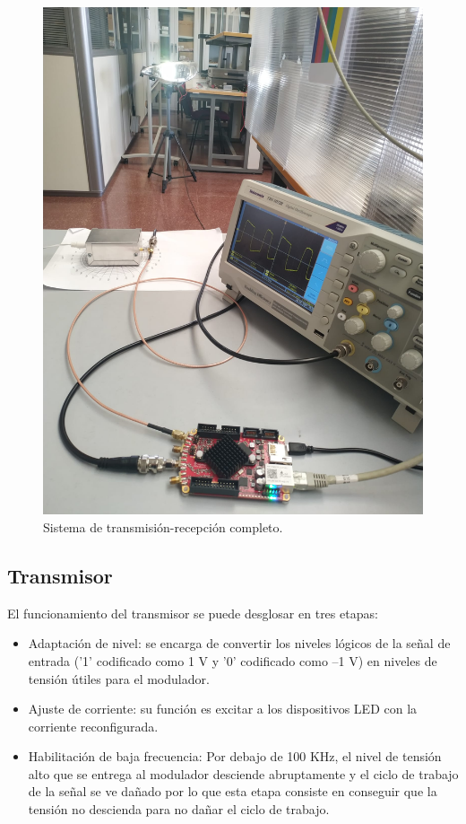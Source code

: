 \begin{figure}[ht]
    \centering
    \includegraphics[scale=0.14]{./figuras/Enlace.jpeg}
    \caption{\small{Sistema de transmisión-recepción completo.}}
    \label{enlace}%
\end{figure}
\newpage
\subsection{Transmisor}
El funcionamiento del transmisor se puede desglosar en tres etapas:
\begin{itemize}
    \item Adaptación de nivel: se encarga de convertir los niveles lógicos de la señal 
    de entrada ('1' codificado como 1 V y '0' codificado como –1 V) en niveles de tensión 
    útiles para el modulador.
    \item Ajuste de corriente: su función es excitar a los dispositivos
    LED con la corriente reconfigurada.
    \item Habilitación de baja frecuencia: Por debajo de 100 KHz, el nivel de tensión alto 
    que se entrega al modulador desciende abruptamente y el ciclo de trabajo de la señal se 
    ve dañado por lo que esta etapa consiste en conseguir que la tensión no descienda para
    no dañar el ciclo de trabajo.
\end{itemize}

